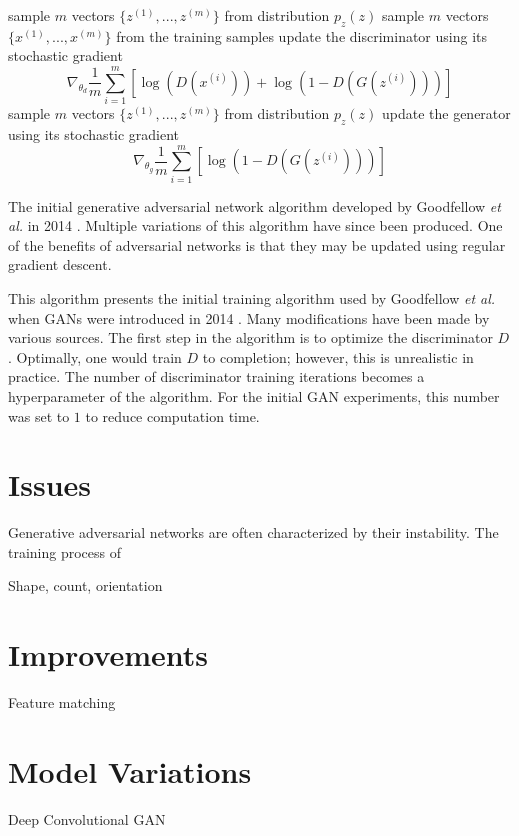 \documentclass[11pt]{article}
\begin{document}
\begin{algorithm}[H]
  \SetAlgoLined
   \linebreak
   \linebreak
   {
     {
      sample $m$ vectors $\{z^{(1)},...,z^{(m)}\}$ from distribution $p_z(z)$\;
      sample $m$ vectors $\{x^{(1)},...,x^{(m)}\}$ from the training samples\;
      update the discriminator using its stochastic gradient
      $$\nabla_{\theta_d}\frac{1}{m}\sum_{i=1}^{m}[\log(D(x^{(i)}))+\log(1-D(G(z^{(i)})))]$$
    }
    sample $m$ vectors $\{z^{(1)},...,z^{(m)}\}$ from distribution $p_z(z)$\;
    update the generator using its stochastic gradient\;
    $$\nabla_{\theta_g}\frac{1}{m}\sum_{i=1}^{m}[\log(1-D(G(z^{(i)})))]$$
  }
  \caption{The initial generative adversarial network algorithm developed by Goodfellow \textit{et al.} in 2014 \citep{2014arXiv1406.2661G}. Multiple variations of this algorithm have since been produced. One of the benefits of adversarial networks is that they may be updated using regular gradient descent.}
\end{algorithm}

This algorithm presents the initial training algorithm used by Goodfellow \textit{et al.} when GANs were introduced in 2014 \citep{2014arXiv1406.2661G}. Many modifications have been made by various sources. The first step in the algorithm is to optimize the discriminator $D$. Optimally, one would train $D$ to completion; however, this is unrealistic in practice. The number of discriminator training iterations becomes a hyperparameter of the algorithm. For the initial GAN experiments, this number was set to $1$ to reduce computation time.

\section{Issues}
Generative adversarial networks are often characterized by their instability. The training process of

Shape, count, orientation

\section{Improvements}
Feature matching



\section{Model Variations}
Deep Convolutional GAN
\end{document}
